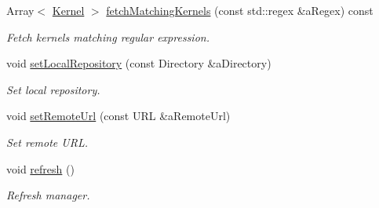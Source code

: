 \begin{DoxyCompactItemize}
Array$<$ \hyperlink{classlibrary_1_1physics_1_1env_1_1ephem_1_1spice_1_1_kernel}{Kernel} $>$ \hyperlink{classlibrary_1_1physics_1_1env_1_1ephem_1_1spice_1_1_manager_ac6f9fa45224f6f1116e66ae2c32e3e65}{fetch\+Matching\+Kernels} (const std\+::regex \&a\+Regex) const
\begin{DoxyCompactList}\small\item\em Fetch kernels matching regular expression. \end{DoxyCompactList}\item 
void \hyperlink{classlibrary_1_1physics_1_1env_1_1ephem_1_1spice_1_1_manager_a98450d702f95a67b53fe3f08ba6e8625}{set\+Local\+Repository} (const Directory \&a\+Directory)
\begin{DoxyCompactList}\small\item\em Set local repository. \end{DoxyCompactList}\item 
void \hyperlink{classlibrary_1_1physics_1_1env_1_1ephem_1_1spice_1_1_manager_acddf543ad7c3ba467311166dc2192458}{set\+Remote\+Url} (const U\+RL \&a\+Remote\+Url)
\begin{DoxyCompactList}\small\item\em Set remote U\+RL. \end{DoxyCompactList}\item 
void \hyperlink{classlibrary_1_1physics_1_1env_1_1ephem_1_1spice_1_1_manager_ae09ea8ee9bb108497fad079308d9becd}{refresh} ()
\begin{DoxyCompactList}\small\item\em Refresh manager. \end{DoxyCompactList}\end{DoxyCompactItemize}
